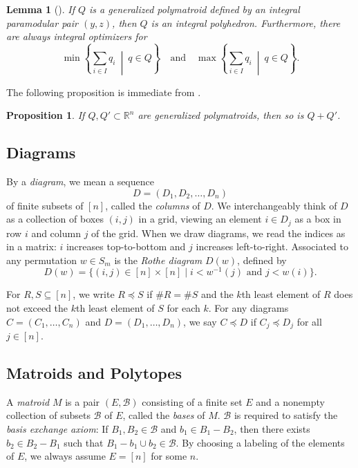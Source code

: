 \documentclass{amsart}
\newtheorem{proposition}[theorem]{Proposition}
\newtheorem{lemma}[theorem]{Lemma}
\theoremstyle{definition}
\theoremstyle{named}
\newcommand{\B}{\mathcal{B}}
\begin{document}
	\begin{lemma}[{\cite[Theorem 14.2.10]{frank}}]
		\label{lem:integralgpoly}
		If $Q$ is a generalized polymatroid defined by an integral paramodular pair $(y,z)$, then $Q$ is an integral polyhedron. Furthermore, there are always integral optimizers for 
		\[
		\min\left\{\sum_{i\in I} q_{i} \ \middle| \ q\in Q\right\} \quad \mbox{and}\quad \max\left\{\sum_{i\in I} q_{i} \ \middle| \ q\in Q\right\}. 
		\]
	\end{lemma}
	
	
	The following proposition is immediate from \cite[Theorem 1]{recognizing}.
	\begin{proposition}
		\label{prop:mink-sum}
		If $Q,Q'\subset \mathbb{R}^n$ are generalized polymatroids, then so is $Q+Q'$.
	\end{proposition}
	
	\subsection{Diagrams}
	
	By a \emph{diagram}, we mean a sequence 
	\[D=(D_1,D_2,\ldots,D_n)\]
	of finite subsets of $[n]$, called the \emph{columns} of $D$. We interchangeably think of $D$ as a collection of boxes $(i,j)$ in a grid, viewing an element $i\in D_j$ as a box in row $i$ and column $j$ of the grid. When we draw diagrams, we read the indices as in a matrix: $i$ increases top-to-bottom and $j$ increases left-to-right. Associated to any permutation $w\in S_m$ is the \emph{Rothe diagram} $D(w)$, defined by
	\[ D(w)=\{(i,j)\in [n]\times [n] \mid i<w^{-1}(j)\mbox{ and } j<w(i) \}. \]
	
	For $R,S\subseteq [n]$, we write $R\preccurlyeq S$ if $\#R=\#S$ and the $k$\/th least element of $R$ does not exceed the $k$\/th least element of $S$ for each $k$. For any diagrams $C=(C_1,\ldots, C_n)$ and $D=(D_1,\ldots, D_n)$, we say $C\preccurlyeq D$ if $C_j\preccurlyeq D_j$ for all $j\in[n]$. 
	
	\subsection{Matroids and Polytopes}
	
	A \emph{matroid} $M$ is a pair $(E, \B)$ consisting of a finite set $E$ and a nonempty collection of subsets $\B$ of $E$, 
	called the \emph{bases} of $M$. $\B$ is required to satisfy the \emph{basis exchange axiom}: 
	If $B_1, B_2 \in \B$ and $b_1 \in B_1- B_2$, then there exists $b_2 \in B_2 - B_1$ such that $B_1 - b_1 \cup b_2 \in \B$. By choosing a labeling of the elements of $E$, we always assume $E=[n]$ for some $n$.
	
\end{document}

